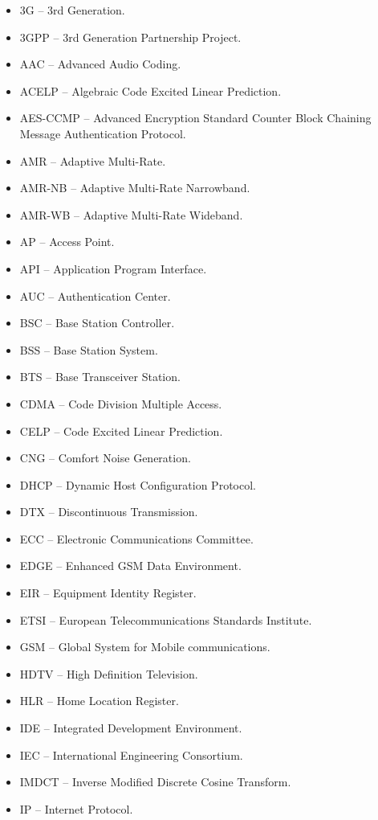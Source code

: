 \documentclass[12pt,svgnames,smaller]{article} %
\begin{document}
\begin{itemize}
	\item 3G – 3rd Generation.
	\item 3GPP – 3rd Generation Partnership Project.
	\item AAC – Advanced Audio Coding.
	\item ACELP – Algebraic Code Excited Linear Prediction. 
	\item AES-CCMP – Advanced Encryption Standard Counter Block Chaining Message Authentication Protocol.
	\item AMR – Adaptive Multi-Rate.
	\item AMR-NB – Adaptive Multi-Rate Narrowband. 
	\item AMR-WB – Adaptive Multi-Rate Wideband.
	\item AP – Access Point.
	\item API – Application Program Interface.
	\item AUC – Authentication Center.
	\item BSC – Base Station Controller. 
	\item BSS – Base Station System.
	\item BTS – Base Transceiver Station.
	\item CDMA – Code Division Multiple Access. 
	\item CELP – Code Excited Linear Prediction.
	\item CNG – Comfort Noise Generation.
	\item DHCP – Dynamic Host Configuration Protocol.
	\item DTX – Discontinuous Transmission.
	\item ECC – Electronic Communications Committee.
	\item EDGE – Enhanced GSM Data Environment.
	\item EIR – Equipment Identity Register.
	\item ETSI – European Telecommunications Standards Institute.
	\item GSM – Global System for Mobile communications.
	\item HDTV – High Definition Television.
	\item HLR – Home Location Register.
	\item IDE – Integrated Development Environment.
	\item IEC – International Engineering Consortium.
	\item IMDCT – Inverse Modified Discrete Cosine Transform.
	\item IP – Internet Protocol.

\end{itemize}
\end{document}
